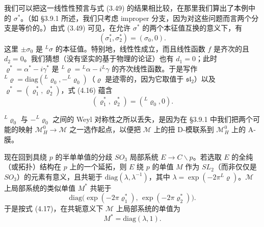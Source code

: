 \documentclass[11pt,a4paper]{article}
\begin{document}

我们可以把这一线性性预言与式 (3.49) 的结果相比较，在那里我们算出了本例中的 $\sigma^*$。（如 §3.9.1 所述，我们只考虑 improper 分支，因为对这些问题而言两个分支是等价的。）由式 (3.49) 可见，在允许 $\sigma^*$ 的两个本征值互换的意义下，有
\begin{equation}\tag{4.16}
(\sigma_1^*,\sigma_2^*)=(\sigma_0,0).
\end{equation}
这里 $\pm\sigma_0$ 是 ${}^L\sigma$ 的本征值。特别地，线性性成立，而且线性函数 $f$ 是齐次的且 $d_2=0$。我们猜想（没有坚实的基于物理的论证）也有 $d_1=0$；此时 $\varrho^*=\alpha^*-i\gamma^*$ 是 ${}^L\varrho={}^L\alpha-i{}^L\gamma$ 的齐次线性函数。于是写作 ${}^L\varrho=\mathrm{diag}({}^L\varrho_0,-{}^L\varrho_0)$（$\varrho$ 是迹零的，因为它取值于 $\mathfrak{sl}_2$）以及 $\varrho^*=(\varrho_1^*,\varrho_2^*)$，式 (4.16) 蕴含
\begin{equation}\tag{4.17}
(\varrho_1^*,\varrho_2^*)=({}^L\varrho_0,0).
\end{equation}

${}^L\varrho_0$ 与 $-{}^L\varrho_0$ 之间的 Weyl 对称性之所以丢失，是因为在 §3.9.1 中我们把两个可能的映射 $\mathcal{M}_H^0\to\mathcal{M}$ 之一选作起点，以便把 $\mathcal{M}$ 上的扭 D-模联系到 $\mathcal{M}_H^0$ 上的 A-膜。


现在回到具绕 $p$ 的半单单值的分歧 $SO_3$ 局部系统 $E\to C\backslash p$。若选取 $E$ 的全纯（或拓扑）结构在 $p$ 上的一个延拓，则 $E$ 绕 $p$ 的单值 $M$ 作为 $SL_2$（而非仅仅是 $SO_3$）的元素有意义，且共轭于 $\mathrm{diag}(\lambda,\lambda^{-1})$，其中 $\lambda=\exp(-2\pi{}^L\varrho)$。$\mathcal{M}$ 上局部系统的类似单值 $M^*$ 共轭于
\[
\mathrm{diag}\bigl(\exp(-2\pi\varrho_1^*),\,\exp(-2\pi\varrho_2^*)\bigr).
\]
于是按式 (4.17)，在共轭意义下 $\mathcal{M}$ 上局部系统的单值为
\begin{equation}\tag{4.18}
M^*=\mathrm{diag}(\lambda,1).
\end{equation}
\end{document}
